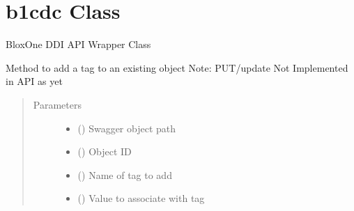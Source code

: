\documentclass[letterpaper,10pt,english]{sphinxmanual}
\begin{document}
\section{b1cdc Class}
\label{\detokenize{b1cdc-class:b1cdc-class}}\label{\detokenize{b1cdc-class::doc}}

\begin{fulllineitems}
\label{\detokenize{b1cdc-class:bloxone.b1cdc}}
\sphinxAtStartPar
BloxOne DDI API Wrapper Class

\begin{fulllineitems}
\label{\detokenize{b1cdc-class:bloxone.b1cdc.add_tag}}
\sphinxAtStartPar
Method to add a tag to an existing object
Note: PUT/update Not Implemented in API as yet
\begin{quote}\begin{description}
\item[{Parameters}] \leavevmode\begin{itemize}
\item {} 
\sphinxAtStartPar
{} () \textendash{} Swagger object path

\item {} 
\sphinxAtStartPar
{} () \textendash{} Object ID

\item {} 
\sphinxAtStartPar
{} () \textendash{} Name of tag to add

\item {} 
\sphinxAtStartPar
{} () \textendash{} Value to associate with tag


\end{itemize}
\end{description}
\end{quote}
\end{fulllineitems}
\end{fulllineitems}
\end{document}
